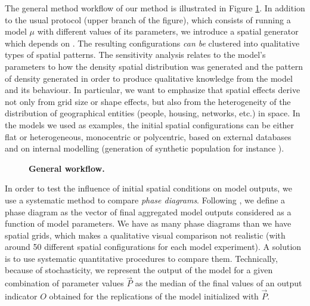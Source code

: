 \documentclass[3p,times,procedia]{elsarticle}
\begin{document}
The general method workflow of our method is illustrated in Figure \ref{fig:method}. In addition to the usual protocol (upper branch of the figure), which consists of running a model $\mu$ with different values of its parameters, we introduce a spatial generator which depends on . The resulting configurations \emph{can be} clustered into qualitative types of spatial patterns. The sensitivity analysis relates to the model's parameters to how the density spatial distribution was generated and the pattern of density generated in order to produce qualitative knowledge from the model and its behaviour. In particular, we want to emphasize that spatial effects derive not only from grid size or shape effects, but also from the heterogeneity of the distribution of geographical entities (people, housing, networks, etc.) in space. In the models we used as examples, the initial spatial configurations can be either flat or heterogeneous, monocentric or polycentric, based on external databases and on internal modelling (generation of synthetic population for instance \citep{bhat1999activity}).
\begin{figure}[htbp] 
\begin{center} 
 \caption{\textbf{General workflow.}} \label{fig:method}
\end{center}
\end{figure} %


In order to test the influence of initial spatial conditions on model outputs, we use a systematic method to compare \emph{phase diagrams}. Following \citet{Gauvinetal2009}, we define a phase diagram as the vector of final aggregated model outputs considered as a function of model parameters. We have as many phase diagrams than we have spatial grids, which makes a qualitative visual comparison not realistic (with around 50 different spatial configurations for each model experiment). A solution is to use systematic quantitative procedures to compare them.
Technically, because of stochasticity, we represent the output of the model for a given combination of parameter values $\vec{P}$ as the median of the final values of an output indicator $O$ obtained for the replications of the model initialized with $\vec{P}$.\\
\end{document}
